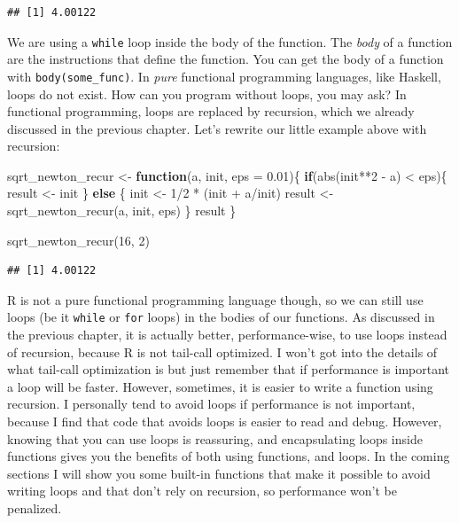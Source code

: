\documentclass[
]{article}
\newenvironment{Shaded}{\begin{snugshade}}{\end{snugshade}}
\newcommand{\AttributeTok}[1]{\textcolor[rgb]{0.77,0.63,0.00}{#1}}
\newcommand{\ControlFlowTok}[1]{\textcolor[rgb]{0.13,0.29,0.53}{\textbf{#1}}}
\newcommand{\DecValTok}[1]{\textcolor[rgb]{0.00,0.00,0.81}{#1}}
\newcommand{\FloatTok}[1]{\textcolor[rgb]{0.00,0.00,0.81}{#1}}
\newcommand{\FunctionTok}[1]{\textcolor[rgb]{0.00,0.00,0.00}{#1}}
\newcommand{\NormalTok}[1]{#1}
\newcommand{\OtherTok}[1]{\textcolor[rgb]{0.56,0.35,0.01}{#1}}
\newcommand{\SpecialCharTok}[1]{\textcolor[rgb]{0.00,0.00,0.00}{#1}}
\begin{document}
\begin{verbatim}
## [1] 4.00122
\end{verbatim}

We are using a \texttt{while} loop inside the body of the function. The \emph{body} of a function are the
instructions that define the function. You can get the body of a function with \texttt{body(some\_func)}.
In \emph{pure} functional programming languages, like Haskell, loops do not exist. How can you
program without loops, you may ask? In functional programming, loops are replaced by recursion,
which we already discussed in the previous chapter. Let's rewrite our little example above
with recursion:

\begin{Shaded}
\begin{Highlighting}[]
\NormalTok{sqrt\_newton\_recur }\OtherTok{\textless{}{-}} \ControlFlowTok{function}\NormalTok{(a, init, }\AttributeTok{eps =} \FloatTok{0.01}\NormalTok{)\{}
    \ControlFlowTok{if}\NormalTok{(}\FunctionTok{abs}\NormalTok{(init}\SpecialCharTok{**}\DecValTok{2} \SpecialCharTok{{-}}\NormalTok{ a) }\SpecialCharTok{\textless{}}\NormalTok{ eps)\{}
\NormalTok{        result }\OtherTok{\textless{}{-}}\NormalTok{ init}
\NormalTok{    \} }\ControlFlowTok{else}\NormalTok{ \{}
\NormalTok{        init }\OtherTok{\textless{}{-}} \DecValTok{1}\SpecialCharTok{/}\DecValTok{2} \SpecialCharTok{*}\NormalTok{ (init }\SpecialCharTok{+}\NormalTok{ a}\SpecialCharTok{/}\NormalTok{init)}
\NormalTok{        result }\OtherTok{\textless{}{-}} \FunctionTok{sqrt\_newton\_recur}\NormalTok{(a, init, eps)}
\NormalTok{    \}}
\NormalTok{    result}
\NormalTok{\}}
\end{Highlighting}
\end{Shaded}

\begin{Shaded}
\begin{Highlighting}[]
\FunctionTok{sqrt\_newton\_recur}\NormalTok{(}\DecValTok{16}\NormalTok{, }\DecValTok{2}\NormalTok{)}
\end{Highlighting}
\end{Shaded}

\begin{verbatim}
## [1] 4.00122
\end{verbatim}

R is not a pure functional programming language though, so we can still use loops (be it \texttt{while} or
\texttt{for} loops) in the bodies of our functions. As discussed in the previous chapter, it is actually
better, performance-wise, to use loops instead of recursion, because R is not tail-call optimized.
I won't got into the details of what tail-call optimization is but just remember that if
performance is important a loop will be faster. However, sometimes, it is easier to write a
function using recursion. I personally tend to avoid loops if performance is not important,
because I find that code that avoids loops is easier to read and debug. However, knowing that
you can use loops is reassuring, and encapsulating loops inside functions gives you the benefits of
both using functions, and loops. In the coming sections I will show you some built-in functions
that make it possible to avoid writing loops and that don't rely on recursion, so performance
won't be penalized.
\end{document}
